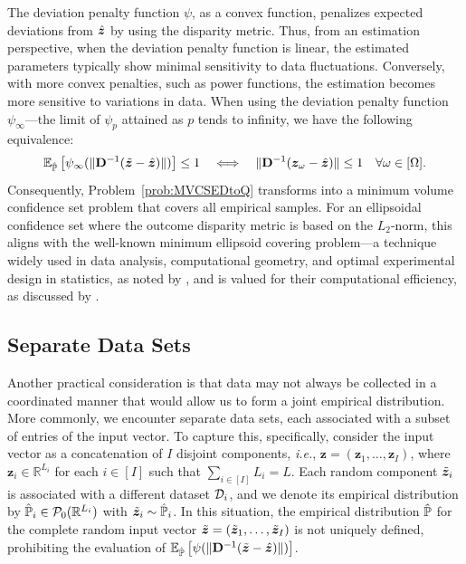 \documentclass[mnsc, nonblindrev]{informswp}
\newcommand{\1}[1]{\mathds{1}{\left(#1\right)}}
\begin{document}
The deviation penalty function $\psi$, as a convex function, penalizes expected deviations from $\hat{\bm{z}}$ by using the disparity metric. Thus, from an estimation perspective, when the deviation penalty function is linear, the estimated parameters typically show minimal sensitivity to data fluctuations. Conversely, with more convex penalties, such as power functions, the estimation becomes more sensitive to variations in data. When using the deviation penalty function $\psi_\infty$---the limit of $\psi_p$ attained as $p$ tends to infinity, we have the following equivalence:
$$
\mathbb{E}_{\hat{\mathbb{P}}}\left[\psi_\infty(\|{\mathbf{D}}^{-1}( \tilde{\bm{z}} - \hat{\bm{z}} )\|)\right] \leq 1
~~~\Longleftrightarrow~~~
\|{\mathbf{D}}^{-1}( \bm z_{\omega} - \hat{\bm{z}} )\| \leq 1 ~~~\forall \omega \in [\Omega]. 
$$
Consequently, Problem~\eqref{prob:MVCSEDtoQ} transforms into a minimum volume confidence set problem that covers all empirical samples. For an ellipsoidal confidence set where the outcome disparity metric is based on the $L_2$-norm, this aligns with the well-known minimum ellipsoid covering problem---a technique widely used in data analysis, computational geometry, and optimal experimental design in statistics, as noted by \cite{todd2016minimum}, and is valued for their computational efficiency, as discussed by \cite{sun2004computation}.

\subsection{Separate Data Sets}
Another practical consideration is that data may not always be collected in a coordinated manner that would allow us to form a joint empirical distribution. More commonly, we encounter separate data sets, each associated with a subset of entries of the input vector. To capture this, specifically, consider the input vector as a concatenation of $I$ disjoint components, \textit{i.e.}, $\bm z = (\bm z_1, \dots, \bm z_I)$, where $\bm z_i \in \mathbb{R}^{L_i}$ for each $i \in [I]$ such that $\sum_{i \in [I]}L_i = L$. Each random component $\tilde{\bm{z}}_i$ is associated with a different dataset $\mathcal{D}_i$, and we denote its empirical distribution by $\hat{\mathbb{P}}_i \in \mathcal{P}_0(\mathbb{R}^{L_i})$ with $\tilde{\bm{z}}_i \sim \hat{\mathbb{P}}_i$. In this situation, the empirical distribution $\hat{\mathbb{P}}$ for the complete random input vector $\tilde{\bm{z}} = (\tilde{\bm{z}}_1, \dots, \tilde{\bm{z}}_I)$ is not uniquely defined, prohibiting the evaluation of $\mathbb{E}_{\hat{\mathbb{P}}}\left[\psi(\|{\mathbf{D}}^{-1}(\tilde{\bm{z}} - \hat{\bm{z}})\|)\right]$.
\end{document}
